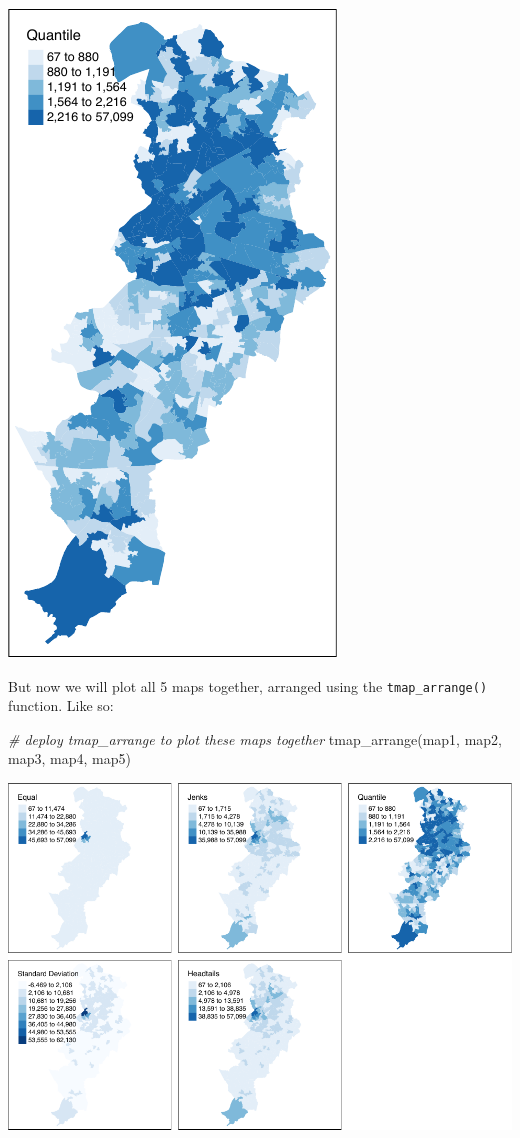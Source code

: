 \documentclass[
]{book}
\newenvironment{Shaded}{\begin{snugshade}}{\end{snugshade}}
\newcommand{\CommentTok}[1]{\textcolor[rgb]{0.56,0.35,0.01}{\textit{#1}}}
\newcommand{\FunctionTok}[1]{\textcolor[rgb]{0.00,0.00,0.00}{#1}}
\newcommand{\NormalTok}[1]{#1}
\begin{document}
\includegraphics{crime_mapping_files/figure-latex/unnamed-chunk-100-1.pdf}

But now we will plot all 5 maps together, arranged using the \texttt{tmap\_arrange()} function. Like so:

\begin{Shaded}
\begin{Highlighting}[]
\CommentTok{\# deploy tmap\_arrange to plot these maps together}
\FunctionTok{tmap\_arrange}\NormalTok{(map1, map2, map3, map4, map5) }
\end{Highlighting}
\end{Shaded}

\includegraphics{crime_mapping_files/figure-latex/unnamed-chunk-101-1.pdf}
\end{document}
